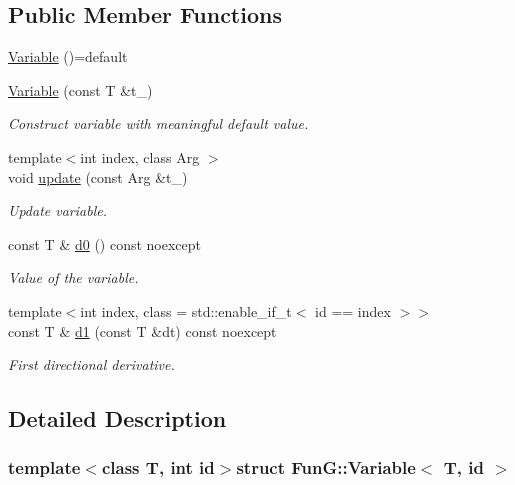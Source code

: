 \subsection*{Public Member Functions}
\begin{DoxyCompactItemize}
\item 
\hyperlink{structFunG_1_1Variable_a20d207e651ee9e93c86dfa4ea1053f56}{Variable} ()=default
\item 
\hyperlink{structFunG_1_1Variable_a10238450dac2ec4c98400b106543ff8f}{Variable} (const T \&t\+\_\+)
\begin{DoxyCompactList}\small\item\em Construct variable with meaningful default value. \end{DoxyCompactList}\item 
{\footnotesize template$<$int index, class Arg $>$ }\\void \hyperlink{structFunG_1_1Variable_a50f4d34586aa6a89df604503e0a3c2a9}{update} (const Arg \&t\+\_\+)
\begin{DoxyCompactList}\small\item\em Update variable. \end{DoxyCompactList}\item 
const T \& \hyperlink{structFunG_1_1Variable_a8253be17d26f9070da92635a8e6d410f}{d0} () const noexcept
\begin{DoxyCompactList}\small\item\em Value of the variable. \end{DoxyCompactList}\item 
{\footnotesize template$<$int index, class  = std\+::enable\+\_\+if\+\_\+t$<$ id == index $>$$>$ }\\const T \& \hyperlink{structFunG_1_1Variable_ab96add49c4b2965ce14bc66660d028db}{d1} (const T \&dt) const noexcept
\begin{DoxyCompactList}\small\item\em First directional derivative. \end{DoxyCompactList}\end{DoxyCompactItemize}


\subsection{Detailed Description}
\subsubsection*{template$<$class T, int id$>$struct Fun\+G\+::\+Variable$<$ T, id $>$}

